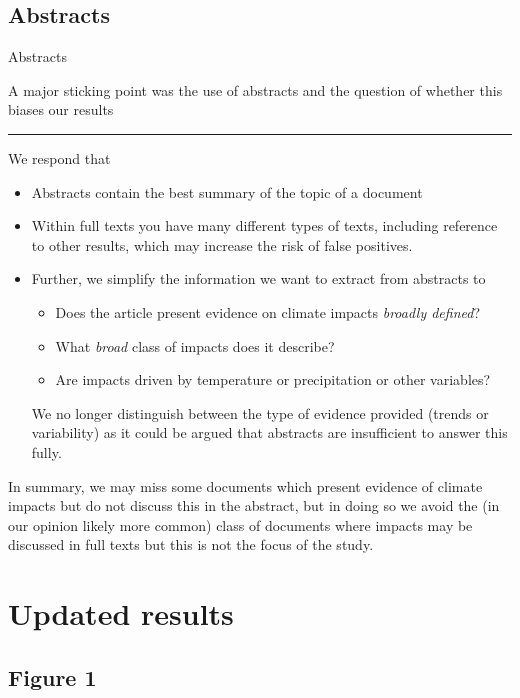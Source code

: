 \documentclass[9pt,aspectratio=169]{beamer}
\begin{document}
\subsection{Abstracts}

\begin{frame}{Abstracts}



	A major sticking point was the use of abstracts and the question of whether this biases our results
	
	\medskip
	\hrule
	\medskip
		

		We respond that
		\begin{itemize}
			\item Abstracts contain the best summary of the topic of a document
			\item Within full texts you have many different types of texts, including reference to other results, which may increase the risk of false positives.
			\item Further, we simplify the information we want to extract from abstracts to 
			\begin{itemize}
				\item Does the article present evidence on climate impacts \textit{broadly defined}?
				\item What \textit{broad} class of impacts does it describe?
				\item Are impacts driven by temperature or precipitation or other variables?
			\end{itemize}
			We no longer distinguish between the type of evidence provided (trends or variability) as it could be argued that abstracts are insufficient to answer this fully.

		\end{itemize}
			In summary, we may miss some documents which present evidence of climate impacts but do not discuss this in the abstract, but in doing so we avoid the (in our opinion likely more common) class of documents where impacts may be discussed in full texts but this is not the focus of the study.


\end{frame}

\section{Updated results}

\subsection{Figure 1}
\end{document}
